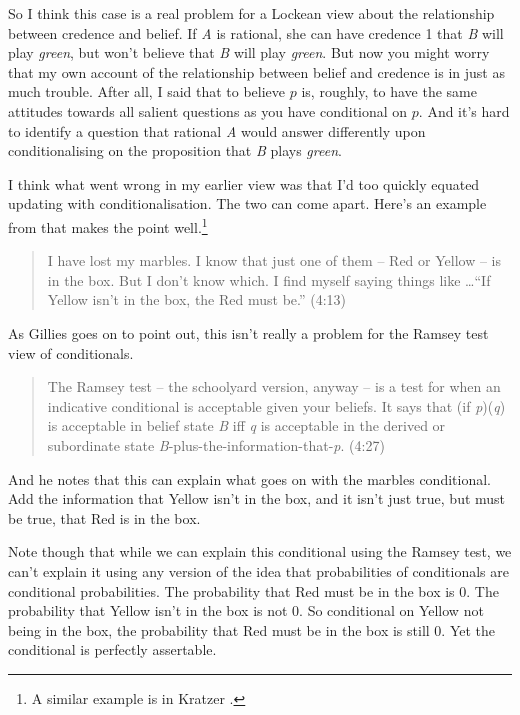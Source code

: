 So I think this case is a real problem for a Lockean view about the relationship between credence and belief. If \textit{A} is rational, she can have credence 1 that \textit{B} will play \textit{green}, but won't believe that \textit{B} will play \textit{green}. But now you might worry that my own account of the relationship between belief and credence is in just as much trouble. After all, I said that to believe $p$ is, roughly, to have the same attitudes towards all salient questions as you have conditional on $p$. And it's hard to identify a question that rational \textit{A} would answer differently upon conditionalising on the proposition that \textit{B} plays \textit{green}.

I think what went wrong in my earlier view was that I'd too quickly equated updating with conditionalisation. The two can come apart. Here's an example from \cite{Gillies2010} that makes the point well.\footnote{A similar example is in Kratzer \citeyearpar[94]{Kratzer2012}.}

\begin{quote}I have lost my marbles. I know that just one of them -- Red or Yellow -- is in the box. But I don't know which. I find myself saying things like \dots ``If Yellow isn't in the box, the Red must be.'' (4:13)
\end{quote}
As Gillies goes on to point out, this isn't really a problem for the Ramsey test view of conditionals.
\begin{quote}
The Ramsey test -- the schoolyard version, anyway -- is a test for when an indicative conditional is acceptable given your beliefs. It says that (if \textit{p})(\textit{q}) is acceptable in belief state \textit{B} iff \textit{q} is acceptable in the derived or subordinate state \textit{B}-plus-the-information-that-\textit{p}. (4:27)
\end{quote}
And he notes that this can explain what goes on with the marbles conditional. Add the information that Yellow isn't in the box, and it isn't just true, but must be true, that Red is in the box.

Note though that while we can explain this conditional using the Ramsey test, we can't explain it using any version of the idea that probabilities of conditionals are conditional probabilities. The probability that Red must be in the box is 0. The probability that Yellow isn't in the box is not 0. So conditional on Yellow not being in the box, the probability that Red must be in the box is still 0. Yet the conditional is perfectly assertable.

